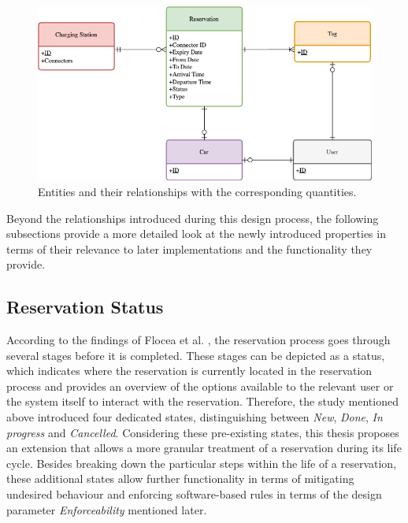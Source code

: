 \begin{figure}[h]
    \centering
    \includegraphics[scale=0.4]{resources/images/main/5_design/Entities.png}
    \caption{Entities and their relationships with the corresponding quantities.}
    \label{fig:entity-relationship-diagram}
\end{figure}

\noindent Beyond the relationships introduced during this design process, the following subsections provide a more detailed look at the newly introduced properties in terms of their relevance to later implementations and the functionality they provide.

\subsection{Reservation Status}
\label{ch:Design:sec:Reservation:ssec:Reservation Status}

According to the findings of Flocea et al. \cite{flocea_electric_2022}, the reservation process goes through several stages before it is completed. These stages can be depicted as a status, which indicates where the reservation is currently located in the reservation process and provides an overview of the options available to the relevant user or the system itself to interact with the reservation.
Therefore, the study mentioned above introduced four dedicated states, distinguishing between \textit{New}, \textit{Done}, \textit{In progress} and \textit{Cancelled}.
Considering these pre-existing states, this thesis proposes an extension that allows a more granular treatment of a reservation during its life cycle. Besides breaking down the particular steps within the life of a reservation, these additional states allow further functionality in terms of mitigating undesired behaviour and enforcing software-based rules in terms of the design parameter \textit{Enforceability} mentioned later.

